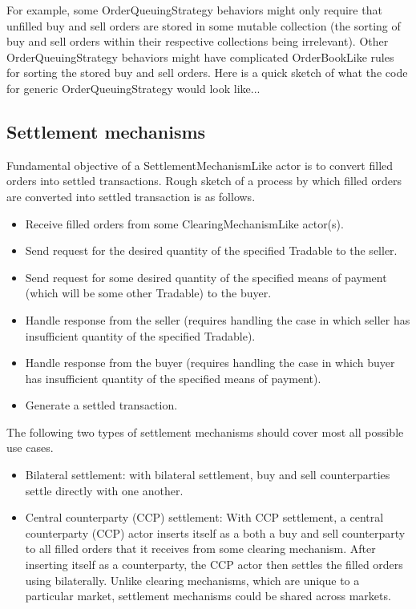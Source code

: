\documentclass[11pt]{amsart}
\begin{document}
For example, some OrderQueuingStrategy behaviors might only require that unfilled buy and sell orders are stored in some mutable collection (the sorting of buy and sell orders within their respective collections being irrelevant). Other OrderQueuingStrategy behaviors might have complicated OrderBookLike rules for sorting the stored buy and sell orders. Here is a quick sketch of what the code for generic OrderQueuingStrategy would look like...

\subsection{Settlement mechanisms} Fundamental objective of a SettlementMechanismLike actor is to convert filled orders into settled transactions. Rough sketch of a process by which filled orders are converted into settled transaction is as follows.
\begin{itemize}
    \item Receive filled orders from some ClearingMechanismLike actor(s).
    \item Send request for the desired quantity of the specified Tradable to the seller. 
    \item Send request for some desired quantity of the specified means of payment (which will be some other Tradable) to the buyer.
    \item Handle response from the seller (requires handling the case in which seller has insufficient quantity of the specified Tradable).
    \item Handle response from the buyer (requires handling the case in which buyer has insufficient quantity of the specified means of payment).
    \item Generate a settled transaction.
\end{itemize}

The following two types of settlement mechanisms should cover most all possible use cases.
\begin{itemize}
    \item Bilateral settlement: with bilateral settlement, buy and sell counterparties settle directly with one another.
    \item Central counterparty (CCP) settlement: With CCP settlement, a central counterparty (CCP) actor inserts itself as a both a buy and sell counterparty to all filled orders that it receives from some clearing mechanism. After inserting itself as a counterparty, the CCP actor then settles the filled orders using bilaterally. Unlike clearing mechanisms, which are unique to a particular market, settlement mechanisms could be shared across markets.
\end{itemize}
\end{document}
